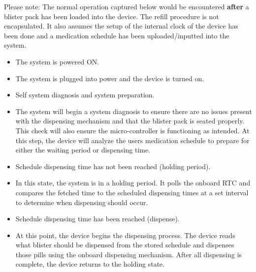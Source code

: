 \documentclass[12pt,titlepage]{article}
\begin{document}
Please note: The normal operation captured below would be encountered \textbf{after} a blister pack has been loaded into the device. The refill procedure is not encapsulated. It also assumes the setup of the internal clock of the device has been done and a medication schedule has been uploaded/inputted into the system.

\begin{itemize}[leftmargin=*]
    \item The system is powered ON.
\end{itemize}
\begin{itemize}[label={}]
\item The system is plugged into power and the device is turned on. 
\end{itemize}
\begin{itemize}[leftmargin=*]
    \item Self system diagnosis and system preparation.
\end{itemize}
\begin{itemize}[label={}]
\item The system will begin a system diagnosis to ensure there are no issues present with the dispensing mechanism and that the blister pack is seated properly. This check will also ensure the micro-controller is functioning as intended. At this step, the device will analyze the users medication schedule to prepare for either the waiting period or dispensing time.
\end{itemize}
\begin{itemize}[leftmargin=*]
    \item Schedule dispensing time has not been reached (holding period).
\end{itemize}
\begin{itemize}[label={}]
\item In this state, the system is in a holding period. It polls the onboard RTC and compares the fetched time to the scheduled dispensing times at a set interval to determine when dispensing should occur.  
\end{itemize}
\begin{itemize}[leftmargin=*]
    \item Schedule dispensing time has been reached (dispense).
\end{itemize}
\begin{itemize}[label={}]
\item At this point, the device begins the dispensing process. The device reads what blister should be dispensed from the stored schedule and dispenses those pills using the onboard dispensing mechanism. After all dispensing is complete, the device returns to the holding state.
\end{itemize}
\end{document}
